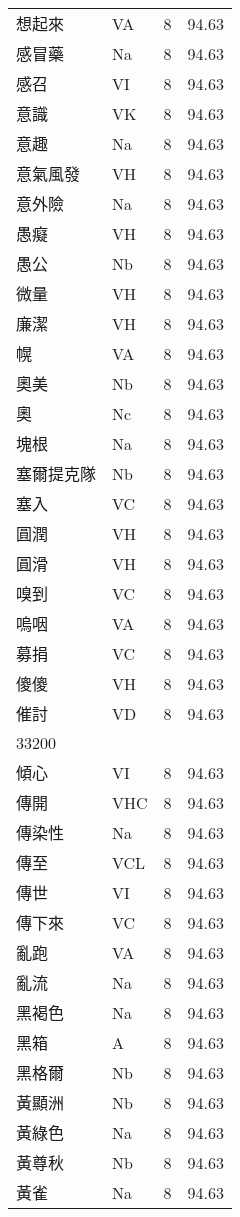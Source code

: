 \documentclass[twocolumn]{book}
\begin{document}
\begin{supertabular}{llrr}
想起來 & VA & 8 &  94.63\\
感冒藥 & Na & 8 &  94.63\\
感召 & VI & 8 &  94.63\\
意識 & VK & 8 &  94.63\\
意趣 & Na & 8 &  94.63\\
意氣風發 & VH & 8 &  94.63\\
意外險 & Na & 8 &  94.63\\
愚癡 & VH & 8 &  94.63\\
愚公 & Nb & 8 &  94.63\\
微量 & VH & 8 &  94.63\\
廉潔 & VH & 8 &  94.63\\
幌 & VA & 8 &  94.63\\
奧美 & Nb & 8 &  94.63\\
奧 & Nc & 8 &  94.63\\
塊根 & Na & 8 &  94.63\\
塞爾提克隊 & Nb & 8 &  94.63\\
塞入 & VC & 8 &  94.63\\
圓潤 & VH & 8 &  94.63\\
圓滑 & VH & 8 &  94.63\\
嗅到 & VC & 8 &  94.63\\
嗚咽 & VA & 8 &  94.63\\
募捐 & VC & 8 &  94.63\\
傻傻 & VH & 8 &  94.63\\
催討 & VD & 8 &  94.63\\
33200\\
傾心 & VI & 8 &  94.63\\
傳開 & VHC & 8 &  94.63\\
傳染性 & Na & 8 &  94.63\\
傳至 & VCL & 8 &  94.63\\
傳世 & VI & 8 &  94.63\\
傳下來 & VC & 8 &  94.63\\
亂跑 & VA & 8 &  94.63\\
亂流 & Na & 8 &  94.63\\
黑褐色 & Na & 8 &  94.63\\
黑箱 & A & 8 &  94.63\\
黑格爾 & Nb & 8 &  94.63\\
黃顯洲 & Nb & 8 &  94.63\\
黃綠色 & Na & 8 &  94.63\\
黃尊秋 & Nb & 8 &  94.63\\
黃雀 & Na & 8 &  94.63\\

\end{supertabular}
\end{document}
